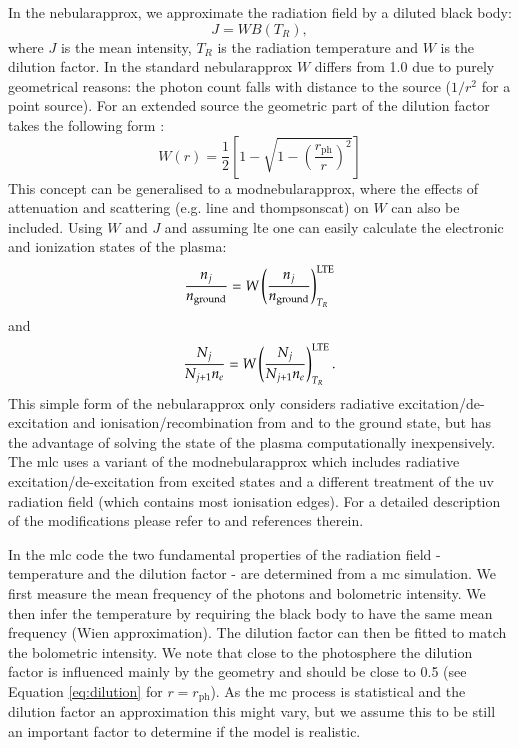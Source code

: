 In the \gls{nebularapprox}, we approximate the radiation field by a diluted black body:
\[
J = W B(T_R),
\]
where $J$ is the mean intensity, $T_R$ is the radiation temperature and $W$ is the dilution factor. In the standard \gls{nebularapprox} $W$ differs from 1.0 due to purely geometrical reasons: the photon count falls with distance to the source ($1/r^2$ for a point source). For an extended source the geometric part of the dilution factor takes the following form \citep{1978stat.book.....M}:
\begin{equation}
W(r) = \frac{1}{2}\left[1-\sqrt{1-\left(\frac{r_\textrm{ph}}{r}\right)^2}\right]
\label{eq:dilution}
\end{equation}
This concept can be generalised to a \gls{modnebularapprox}, where the effects of attenuation and scattering (e.g. line and \gls{thompsonscat}) on $W$ can also be included. Using $W$ and $J$ and assuming \gls{lte} one can easily calculate the electronic and ionization states of the plasma:
\[
\frac{n_j}{n_{\rm ground}} = W \left( \frac{n_j}{n_{\rm ground}} \right) _{T_R}^{\rm LTE}
\]
and 
\[
\frac{N_j}{N_{j+1}n_e} = W \left( \frac{N_j}{N_{j+1}n_e} \right) _{T_R}^{\rm LTE}.
\]
This simple form of the \gls{nebularapprox} only considers radiative excitation/de-excitation and ionisation/recombination from and to the ground state, but has the advantage of solving the state of the plasma computationally inexpensively.
The \gls{mlc} uses a variant of the \gls{modnebularapprox} which includes radiative excitation/de-excitation from excited states and a different treatment of the \gls{uv} radiation field (which contains most ionisation edges). For a detailed description of the modifications please refer to \citet{1993A&A...279..447M} and references therein. 

In the \gls{mlc} code the two fundamental properties of the radiation field - temperature and the dilution factor - are determined from a \gls{mc} simulation. We first measure the mean frequency of the photons and bolometric intensity. We then infer the temperature by requiring the black body to have the same mean frequency (Wien approximation). The dilution factor can then be fitted to match the bolometric intensity. We note that close to the photosphere the dilution factor is influenced mainly by the geometry and should be close to 0.5 (see Equation \ref{eq:dilution} for $r=r_\textrm{ph}$). As the \gls{mc} process is statistical and the dilution factor an approximation this might vary, but we assume this to be still an important factor to determine if the model is realistic. 

